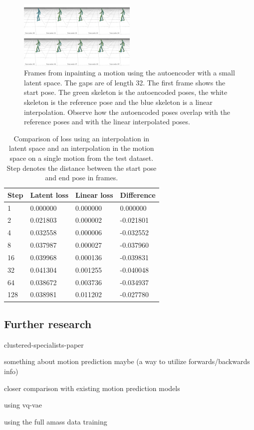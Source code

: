 \begin{figure}[h]
\centering
\includegraphics[width=0.5\textwidth]{img/vae-inpainting}
\caption{Frames from inpainting a motion using the autoencoder with a small latent space. The gaps are of length 32. The first frame shows the start pose. The green skeleton is the autoencoded poses, the white skeleton is the reference pose and the blue skeleton is a linear interpolation. Observe how the autoencoded poses overlap with the reference poses and with the linear interpolated poses.}
\label{fig:vae-inpainting}
\end{figure}

\begin{table}[h]
\centering
\begin{tabular}{@{}llll@{}}
\toprule
Step & Latent loss & Linear loss & Difference  \\ \midrule
1    & 0.000000    & 0.000000    & 0.000000    \\
2    & 0.021803    & 0.000002    & -0.021801   \\
4    & 0.032558    & 0.000006    & -0.032552   \\
8    & 0.037987    & 0.000027    & -0.037960   \\
16   & 0.039968    & 0.000136    & -0.039831   \\
32   & 0.041304    & 0.001255    & -0.040048   \\
64   & 0.038672    & 0.003736    & -0.034937   \\
128  & 0.038981    & 0.011202    & -0.027780   \\ \bottomrule
\end{tabular}
\caption{Comparison of loss using an interpolation in latent space and an interpolation in the motion space on a single motion from the test dataset. Step denotes the distance between the start pose and end pose in frames.}
\label{tab:vae-eval}
\end{table}




\subsection{Further research}\label{subsec:further-research}
clustered-specialists-paper~\cite{won2020scalable}

something about motion prediction maybe (a way to utilize forwards/backwards info)

closer comparison with existing motion prediction models

using vq-vae

using the full amass data training
